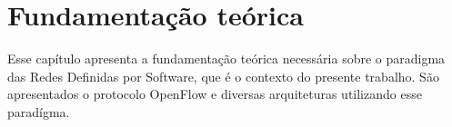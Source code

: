 \chapter{Fundamentação teórica}

Esse capítulo apresenta a fundamentação teórica necessária sobre o paradigma 
das Redes Definidas por Software, que é o contexto do presente trabalho.
São apresentados o protocolo OpenFlow e diversas arquiteturas utilizando esse
paradígma.






